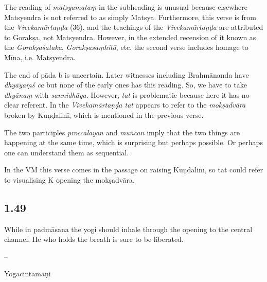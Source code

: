 \begin{ekdosis}
\begin{testimonia}[hp01_048]
\end{testimonia}

\begin{philcomm}[hp01_048]
The reading of \emph{matsyamataṃ} in the subheading is unusual because elsewhere Matsyendra is not referred to as simply Matsya. Furthermore, this verse is from the \emph{Vivekamārtaṇḍa} (36), and the teachings of the \emph{Vivekamārtaṇḍa} are attributed to Gorakṣa, not Matsyendra. However, in the extended recension of it known as the  \emph{Gorakṣaśataka},  \emph{Gorakṣasaṃhitā}, etc. the second verse includes homage to Mīna, i.e. Matsyendra.

The end of pāda b is uncertain. Later witnesses including Brahmānanda have \emph{dhyāyaṃś ca} but none of the early ones has this reading. So, we have to take \emph{dhyānaṃ} with \emph{sannidhāya}. However, \emph{tat} is problematic because here it has no clear referent. In the \emph{Vivekamārtaṇḍa tat} appears to refer to the \emph{mokṣadvāra} broken by Kuṇḍalinī, which is mentioned in the previous verse.

The two participles \emph{proccālayan} and \emph{muñcan} imply that the two things are happening at the same time, which is surprising but perhaps possible. Or perhaps one can understand them as sequential.

In the VM this verse comes in the passage on raising Kuṇḍalinī, so tat could refer to visualising K opening the mokṣadvāra.
\end{philcomm}

\subsection*{1.49}
\begin{translation}[hp01_049]
While in padmāsana the yogi should inhale through the opening to the central channel. He who holds the breath is sure to be liberated.
\end{translation}

\begin{sources}[hp01_049]
--
\end{sources}

\begin{testimonia}[hp01_049]
Yogacintāmaṇi

\begin{versinnote}
\end{versinnote}


\end{testimonia}
\end{ekdosis}

